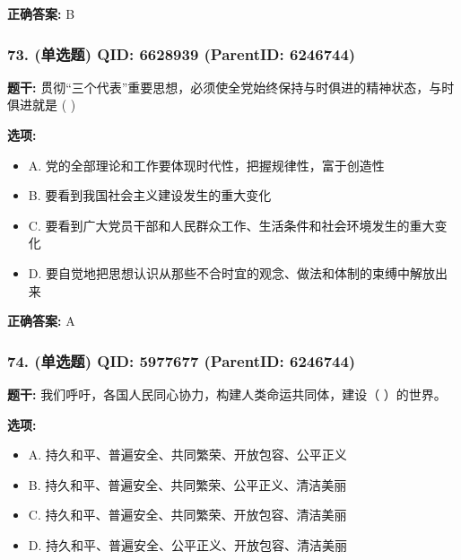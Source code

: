 \documentclass[12pt,UTF8]{ctexart}
\begin{document}
\textbf{正确答案:}
B

\vspace{0.3em}\hrulefill\vspace{0.7em}

\subsubsection*{73. (单选题) \small QID: 6628939 (ParentID: 6246744)}

\textbf{题干:}
贯彻“三个代表”重要思想，必须使全党始终保持与时俱进的精神状态，与时俱进就是  ( )



\textbf{选项:}
\begin{itemize}[leftmargin=*]

  \item A. 党的全部理论和工作要体现时代性，把握规律性，富于创造性

  \item B. 要看到我国社会主义建设发生的重大变化

  \item C. 要看到广大党员干部和人民群众工作、生活条件和社会环境发生的重大变化

  \item D. 要自觉地把思想认识从那些不合时宜的观念、做法和体制的束缚中解放出来

\end{itemize}

\textbf{正确答案:}
A

\vspace{0.3em}\hrulefill\vspace{0.7em}

\subsubsection*{74. (单选题) \small QID: 5977677 (ParentID: 6246744)}

\textbf{题干:}
我们呼吁，各国人民同心协力，构建人类命运共同体，建设（ ）的世界。



\textbf{选项:}
\begin{itemize}[leftmargin=*]

  \item A. 持久和平、普遍安全、共同繁荣、开放包容、公平正义

  \item B. 持久和平、普遍安全、共同繁荣、公平正义、清洁美丽

  \item C. 持久和平、普遍安全、共同繁荣、开放包容、清洁美丽

  \item D. 持久和平、普遍安全、公平正义、开放包容、清洁美丽

\end{itemize}
\end{document}
